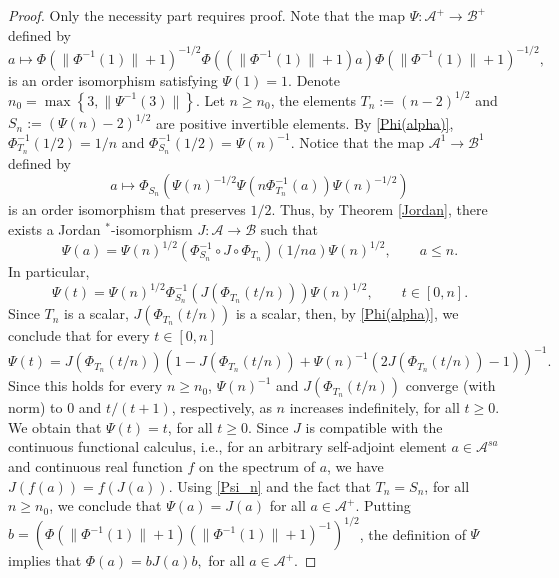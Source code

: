 \documentclass[12pt]{amsart}
\theoremstyle{definition}
\theoremstyle{remark}
\numberwithin{equation}{section}
\begin{document}
\begin{proof}
Only the necessity part requires proof. Note that the map $\Psi:\mathcal{A}^+\to\mathcal{B}^+$ defined by $$a\mapsto \Phi\left( \|\Phi^{-1}(1)\|+1\right) ^{-1/2}\Phi\left( (\|\Phi^{-1}(1)\|+1)a\right) \Phi\left( \|\Phi^{-1}(1)\|+1\right)^{-1/2},$$
 is an order isomorphism satisfying $\Psi(1)=1$. Denote $n_0=\max\left\lbrace 3, \|\Psi^{-1}(3) \|\right\rbrace $. Let $n\geq n_0$, the elements $T_n:=(n-2)^{1/2}$ and $S_n:=(\Psi(n)-2)^{1/2}$ are  positive invertible elements. By \eqref{Phi(alpha)}, $\Phi_{T_n}^{-1}(1/2)=1/n$ and $\Phi_{S_n}^{-1}(1/2)=\Psi(n)^{-1}$. Notice that the map $\mathcal{A}^1\to\mathcal{B}^1$ defined by $$a\mapsto \Phi_{S_n}\left( \Psi(n)^{-1/2}\Psi(n\Phi_{T_n}^{-1}(a))\Psi(n)^{-1/2}\right)$$  is an order isomorphism that preserves $1/2$. Thus, by Theorem \ref{Jordan}, there exists a Jordan $^*$-isomorphism $J:\mathcal{A}\to\mathcal{B}$ such that 
\begin{equation}\label{Psi_n}
	\Psi(a)=\Psi(n)^{1/2}\left( \Phi_{S_n}^{-1}\circ J\circ\Phi_{T_n} \right)(1/n a) \Psi(n)^{1/2},\qquad a\leq n. 
\end{equation}
In particular, $$\Psi(t)=\Psi(n)^{1/2} \Phi_{S_n}^{-1}\left(J\left( \Phi_{T_n} (t/n )\right) \right)\Psi(n)^{1/2}, \qquad t\in[0,n].$$
Since $T_n$ is a scalar,  $J(\Phi_{T_n} (t/n ))$ is a scalar, then, by \eqref{Phi(alpha)}, we conclude that  for every $t\in[0,n]$ $$\Psi(t)=J(\Phi_{T_n} (t/n ))\left(1-J(\Phi_{T_n} (t/n ))+\Psi(n)^{-1}\left( 2J(\Phi_{T_n} (t/n ))-1\right)  \right)^{-1}.$$
Since this  holds for every $n\geq n_0$,  $\Psi(n)^{-1}$ and $ J(\Phi_{T_n} (t/n ))$ converge (with norm) to $0$ and $t/(t+1)$, respectively, as $n$  increases indefinitely,  for all $t\geq0$. We obtain that $\Psi(t)=t$, for all $t\geq0$. Since $J$ is compatible with the continuous
functional calculus, i.e., for an arbitrary self-adjoint element $a\in\mathcal{A}^{sa}$ and continuous
real function $f$ on the spectrum of $a$, we have $J(f(a)) = f(J(a))$. Using \eqref{Psi_n} and the fact that $T_n=S_n$, for all $n\geq n_0$, we conclude that $\Psi(a)=J(a)$ for all $a\in\mathcal{A}^+$. Putting $b=\left( \Phi\left( \|\Phi^{-1}(1)\|+1\right)( \|\Phi^{-1}(1)\|+1)^{-1} \right)^{1/2} $, the definition of $\Psi$ implies that $\Phi(a)=bJ(a)b,$ for all $a\in\mathcal{A}^+$.
\end{proof}
\end{document}
